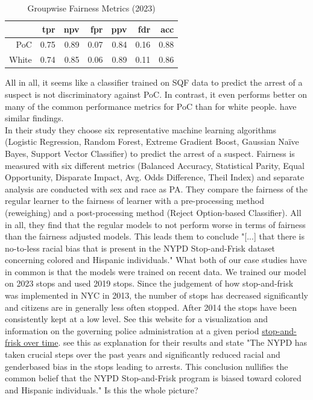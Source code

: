 \begin{table}[ht]
  \centering
  \begin{tabular}{rrrrrrr}
    \hline
   & tpr & npv & fpr & ppv & fdr & acc \\ 
    \hline
    PoC & 0.75 & 0.89 & 0.07 & 0.84 & 0.16 & 0.88 \\ 
    White & 0.74 & 0.85 & 0.06 & 0.89 & 0.11 & 0.86 \\ 
     \hline
  \end{tabular}
  \caption{Groupwise Fairness Metrics (2023)} 
  \label{tab:groupwise_metrics_2023}
\end{table}

All in all, it seems like a classifier trained on SQF data to predict the arrest of a suspect is not discriminatory against PoC. In contrast, it even performs better on many of the common performance metrics for PoC than for white people. \cite{Badr2022DTFANSP} have similar findings.\\
In their study they choose six representative machine learning algorithms (Logistic Regression, Random Forest, Extreme Gradient Boost, Gaussian Naïve Bayes, Support Vector Classifier) to predict the arrest of a suspect. Fairness is measured with six different metrics (Balanced Accuracy, Statistical Parity, Equal Opportunity, Disparate Impact, Avg. Odds Difference, Theil Index) and separate analysis are conducted with sex and race as PA.
They compare the fairness of the regular learner to the fairness of learner with a pre-processing method (reweighing) and a post-processing method (Reject Option-based Classifier). All in all, they find that the regular models to not perform worse in terms of fairness than the fairness adjusted models. This leads them to conclude "[...] that there is no-to-less racial bias that is present in the NYPD Stop-and-Frisk dataset concerning colored and Hispanic individuals."
What both of our case studies have in common is that the models were trained on recent data. We trained our model on 2023 stops and \cite{Badr2022DTFANSP} used 2019 stops. Since the judgement of how stop-and-frisk was implemented in NYC in 2013, the number of stops has decreased significantly and citizens are in generally less often stopped. After 2014 the stops have been consistently kept at a low level. See this website for a visualization and information on the governing police administration at a given period \href{https://www.nyclu.org/data/stop-and-frisk-data}{stop-and-frisk over time}.
\cite{Badr2022DTFANSP} see this as explanation for their results and state "The NYPD has taken crucial steps over the past years and significantly reduced racial and genderbased bias in the stops leading to arrests. This conclusion nullifies the common belief that the NYPD Stop-and-Frisk program is biased toward colored and Hispanic individuals." Is this the whole picture?




